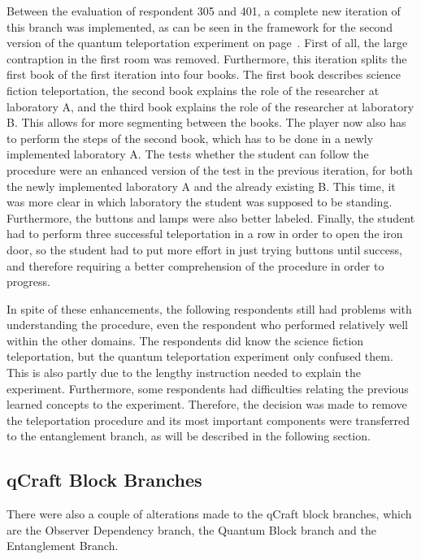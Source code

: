 \documentclass[11pt,twoside]{report} %
\begin{document}
Between the evaluation of respondent 305 and 401, a complete new iteration of this branch was implemented, as can be seen in the framework for the second version of the quantum teleportation experiment on page~\pageref{app:teleportation2}. First of all, the large contraption in the first room was removed. Furthermore, this iteration splits the first book of the first iteration into four books. The first book describes science fiction teleportation, the second book explains the role of the researcher at laboratory A, and the third book explains the role of the researcher at laboratory B. This allows for more segmenting between the books. The player now also has to perform the steps of the second book, which has to be done in a newly implemented laboratory A. The tests whether the student can follow the procedure were an enhanced version of the test in the previous iteration, for both the newly implemented laboratory A and the already existing B. This time, it was more clear in which laboratory the student was supposed to be standing. Furthermore, the buttons and lamps were also better labeled. Finally, the student had to perform three successful teleportation in a row in order to open the iron door, so the student had to put more effort in just trying buttons until success, and therefore requiring a better comprehension of the procedure in order to progress.

In spite of these enhancements, the following respondents still had problems with understanding the procedure, even the respondent who performed relatively well within the other domains. The respondents did know the science fiction teleportation, but the quantum teleportation experiment only confused them. This is also partly due to the lengthy instruction needed to explain the experiment. Furthermore, some respondents had difficulties relating the previous learned concepts to the experiment. Therefore, the decision was made to remove the teleportation procedure and its most important components were transferred to the entanglement branch, as will be described in the following section.

\subsection{qCraft Block Branches}

There were also a couple of alterations made to the qCraft block branches, which are the Observer Dependency branch, the Quantum Block branch and the Entanglement Branch.
\end{document}
